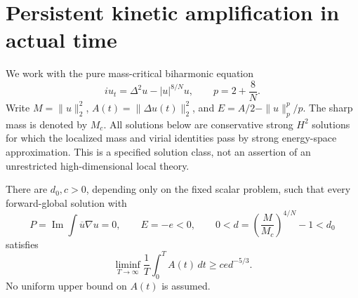 \section{Persistent kinetic amplification in actual time}
\label{sec:r13-persistent}

We work with the pure mass-critical biharmonic equation
\[
 iu_t=\Delta^2u-|u|^{8/N}u,
 \qquad p=2+\frac8N.
\]
Write $M=\|u\|_2^2$, $A(t)=\|\Delta u(t)\|_2^2$, and
$E=A/2-\|u\|_p^p/p$. The sharp mass is denoted by $M_c$.
All solutions below are conservative strong $H^2$ solutions for which
the localized mass and virial identities pass by strong energy-space
approximation. This is a specified solution class, not an assertion of
an unrestricted high-dimensional local theory.

\begin{theorem}\label{thm:r13-persistent}
There are $d_0,c>0$, depending only on the fixed scalar problem, such that
every forward-global solution with
\[
 P=\operatorname{Im}\int\overline u\nabla u=0,
 \qquad E=-e<0,\qquad
 0<d=\left(\frac M{M_c}\right)^{4/N}-1<d_0
\]
satisfies
\begin{equation}\label{eq:r13-average}
 \liminf_{T\to\infty}\frac1T\int_0^T A(t)\,dt
 \ge c e d^{-5/3}.
\end{equation}
No uniform upper bound on $A(t)$ is assumed.
\end{theorem}

